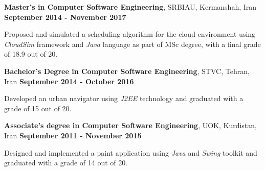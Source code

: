 
\begin{scholarship}
\scholarshipentry{}
{\textbf{Master's in Computer Software Engineering}, SRBIAU, Kermanshah, Iran \hspace{63 pt } \textbf{September 2014 - November 2017}

Proposed and simulated a scheduling algorithm for the cloud environment using \textit{CloudSim} framework and \textit{Java} language as part of MSc degree, with a final grade of 18.9 out of 20. \vspace{5 pt}
}
\scholarshipentry{}
				{\textbf{Bachelor's Degree in Computer Software Engineering}, STVC, Tehran, Iran \hspace{69 pt} \textbf{September 2014 - October 2016}
 
 Developed an urban navigator using \textit{J2EE} technology and graduated with a grade of 15 out of 20. \vspace{5 pt}	
 }		
\scholarshipentry{}
				{\textbf{Associate's degree in Computer Software Engineering}, UOK, Kurdistan, Iran \hspace{50 pt} \textbf{September 2011 - November 2015}
 
 Designed and implemented a paint application using \textit{Java} and \textit{Swing} toolkit and graduated with a grade of 14 out of 20.
 }
\end{scholarship}